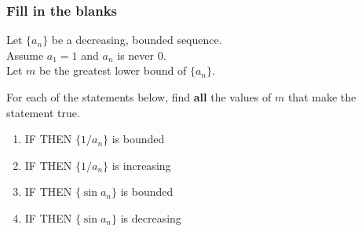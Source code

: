 \documentclass[14pt]{beamer}
\begin{document}
	\begin{frame}[t]
		\fontsize{13}{13}\selectfont
		\frametitle{Fill in the blanks}

		Let $\displaystyle \{a_{n}\}$ be a decreasing, bounded sequence. \\ Assume $a
		_{1}= 1$ and $a_{n}$ is never $0$. \\ Let $m$ be the greatest lower bound of
		$\displaystyle \{a_{n}\}$.\\
		\medskip

		For each of the statements below, find \textbf{all} the values of $m$ that make
		the statement true.

		\begin{enumerate}
			\item IF \boxed{\phantom{????????????}} THEN $\displaystyle \{1/a_{n}\}$
				is bounded

			\item IF \boxed{\phantom{????????????}} THEN $\displaystyle \{1/a_{n}\}$
				is increasing

			\item IF \boxed{\phantom{????????????}} THEN
				$\displaystyle \{\sin a_{n}\}$ is bounded

			\item IF \boxed{\phantom{????????????}} THEN
				$\displaystyle \{\sin a_{n}\}$ is decreasing
		\end{enumerate}
	\end{frame}




\end{document}

